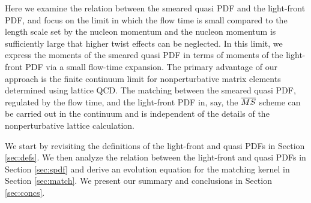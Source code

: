 Here we examine the relation between the smeared quasi 
PDF and the light-front PDF, and focus on the limit in which the flow 
time is small compared to the 
length scale set by the nucleon momentum and the nucleon momentum is 
sufficiently large that higher twist effects can be neglected. In this limit, 
we express the moments of the smeared quasi PDF in terms of moments of the 
light-front PDF via a small flow-time expansion.
The primary advantage of 
our approach is the finite continuum limit for nonperturbative matrix elements 
determined using lattice QCD. The matching between the smeared quasi PDF, 
regulated by the flow time, and the light-front PDF in, say, the $\overline{MS}$ 
scheme can be carried out in the continuum and is independent of the details of 
the nonperturbative lattice calculation.

We start by revisiting the definitions of the light-front and quasi PDFs in 
Section \ref{sec:defs}. We then analyze the relation between the 
light-front and quasi PDFs in Section \ref{sec:spdf} and derive an evolution 
equation for the matching kernel in Section \ref{sec:match}. We 
present our summary and conclusions in Section \ref{sec:concs}.
